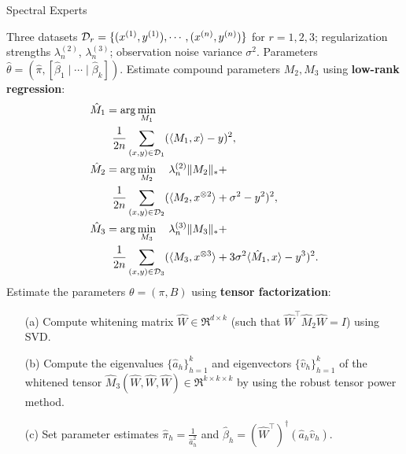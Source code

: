 \begin{algorithm}[t]
  \caption{Spectral Experts}
  \label{algo:spectral-experts}
  \begin{algorithmic}[1]
    \INPUT Three datasets $\mathcal{D}_r = \{ (x^{(1)}, y^{(1)}), \cdots, (x^{(n)}, y^{(n)}) \}$ for $r = 1, 2, 3$;
    regularization strengths $\lambda_n^{(2)}$, $\lambda_n^{(3)}$;
    observation noise variance $\sigma^2$.
    \OUTPUT Parameters $\hat\theta = (\hat \pi, [\hat \beta_1 \mid \cdots \mid \hat \beta_k])$.
    \STATE Estimate compound parameters $M_2, M_3$ using \textbf{low-rank regression}:
    \begin{align}
      &\hat M_1 = \arg\min_{M_1} \label{eqn:estimateM1} \\
      &\quad\quad\frac{1}{2n} \sum_{(x,y) \in \mathcal{D}_1} (\langle M_1, x \rangle - y)^2, \nonumber \\
      &\hat M_2 = \arg\min_{M_2} \quad \lambda_n^{(2)} \|M_2\|_* + \label{eqn:estimateM2} \\
      &\quad\quad\frac{1}{2n} \sum_{(x,y) \in \mathcal{D}_2} (\langle M_2, x^{\otimes 2} \rangle + \sigma^2 - y^2)^2, \nonumber \\
      &\hat M_3 = \arg\min_{M_3} \quad \lambda_n^{(3)} \|M_3\|_* + \label{eqn:estimateM3} \\
      &\quad\quad\frac{1}{2n} \sum_{(x,y) \in \mathcal{D}_3} (\langle M_3, x^{\otimes 3} \rangle + 3 \sigma^2\langle \hat M_1, x \rangle - y^3)^2. \nonumber
    \end{align}
    \STATE Estimate the parameters $\theta = (\pi, B)$ using \textbf{tensor factorization}:
    \begin{enumerate}
      \item [(a)] Compute whitening matrix $\hat W \in \Re^{d \times k}$ (such that $\hat W^\top
      \hat M_2 \hat W = I$) using SVD.
      \item [(b)] Compute the eigenvalues $\{\hat a_h\}_{h=1}^k$
      and eigenvectors $\{\hat v_h\}_{h=1}^k$
      of the whitened tensor $\hat M_3(\hat W, \hat W, \hat W) \in \Re^{k \times k \times k}$
      by using the robust tensor power method.
    \item [(c)] Set parameter estimates $\hat\pi_h = \frac{1}{\hat a_h^2}$
    and $\hat\beta_h = (\hat W^{\top})^\dagger (\hat a_h \hat v_h)$.
    \end{enumerate}
  \end{algorithmic}
\end{algorithm}


